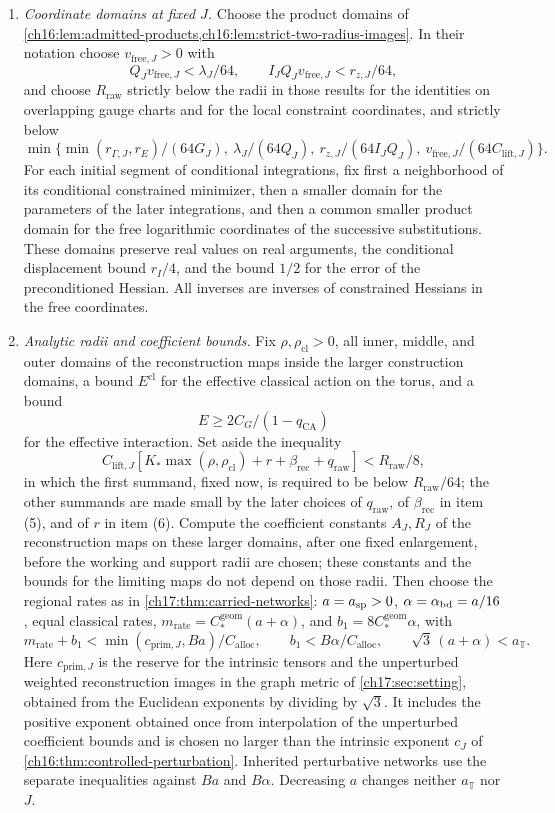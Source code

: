 \begin{theorem}
\begin{enumerate}[label=(\arabic*)]
\item \emph{Coordinate domains at fixed $J$.} Choose the product domains of \cref{ch16:lem:admitted-products,ch16:lem:strict-two-radius-images}. In their notation choose $v_{\mathrm{free},J}>0$ with
\[
 Q_Jv_{\mathrm{free},J}<\lambda_J/64,\qquad I_JQ_Jv_{\mathrm{free},J}<r_{z,J}/64,
\]
and choose $R_{\mathrm{raw}}$ strictly below the radii in those results for the identities on overlapping gauge charts and for the local constraint coordinates, and strictly below
\[
 \min\{\min(r_{\Gamma,J},r_E)/(64G_J),\ \lambda_J/(64Q_J),\ r_{z,J}/(64I_JQ_J),\ v_{\mathrm{free},J}/(64C_{\mathrm{lift},J})\}.
\]
For each initial segment of conditional integrations, fix first a neighborhood of its conditional constrained minimizer, then a smaller domain for the parameters of the later integrations, and then a common smaller product domain for the free logarithmic coordinates of the successive substitutions. These domains preserve real values on real arguments, the conditional displacement bound $r_I/4$, and the bound $1/2$ for the error of the preconditioned Hessian. All inverses are inverses of constrained Hessians in the free coordinates.

\item \emph{Analytic radii and coefficient bounds.} Fix $\rho,\rho_{\mathrm{cl}}>0$, all inner, middle, and outer domains of the reconstruction maps inside the larger construction domains, a bound $E^{\mathrm{cl}}$ for the effective classical action on the torus, and a bound
\[
 E\ge2C_G/(1-q_{\mathrm{CA}})
\]
for the effective interaction. Set aside the inequality
\[
 C_{\mathrm{lift},J}[K_*\max(\rho,\rho_{\mathrm{cl}})+r+\beta_{\mathrm{rec}}+q_{\mathrm{raw}}]<R_{\mathrm{raw}}/8,
\]
in which the first summand, fixed now, is required to be below $R_{\mathrm{raw}}/64$; the other summands are made small by the later choices of $q_{\mathrm{raw}}$, of $\beta_{\mathrm{rec}}$ in item \textup{(5)}, and of $r$ in item \textup{(6)}. Compute the coefficient constants $A_J,R_J$ of the reconstruction maps on these larger domains, after one fixed enlargement, before the working and support radii are chosen; these constants and the bounds for the limiting maps do not depend on those radii. Then choose the regional rates as in \cref{ch17:thm:carried-networks}: $a=a_{\mathrm{sp}}>0$, $\alpha=\alpha_{\mathrm{bd}}=a/16$, equal classical rates, $m_{\mathrm{rate}}=C_*^{\mathrm{geom}}(a+\alpha)$, and $b_1=8C_*^{\mathrm{geom}}\alpha$, with
\[
 m_{\mathrm{rate}}+b_1<\min(c_{\mathrm{prim},J},Ba)/C_{\mathrm{alloc}},\qquad
 b_1<B\alpha/C_{\mathrm{alloc}},\qquad \sqrt3\,(a+\alpha)<a_{\mathbb T}.
\]
Here $c_{\mathrm{prim},J}$ is the reserve for the intrinsic tensors and the unperturbed weighted reconstruction images in the graph metric of \cref{ch17:sec:setting}, obtained from the Euclidean exponents by dividing by $\sqrt3$. It includes the positive exponent obtained once from interpolation of the unperturbed coefficient bounds and is chosen no larger than the intrinsic exponent $c_J$ of \cref{ch16:thm:controlled-perturbation}. Inherited perturbative networks use the separate inequalities against $Ba$ and $B\alpha$. Decreasing $a$ changes neither $a_{\mathbb T}$ nor $J$.


\end{enumerate}
\end{theorem}
